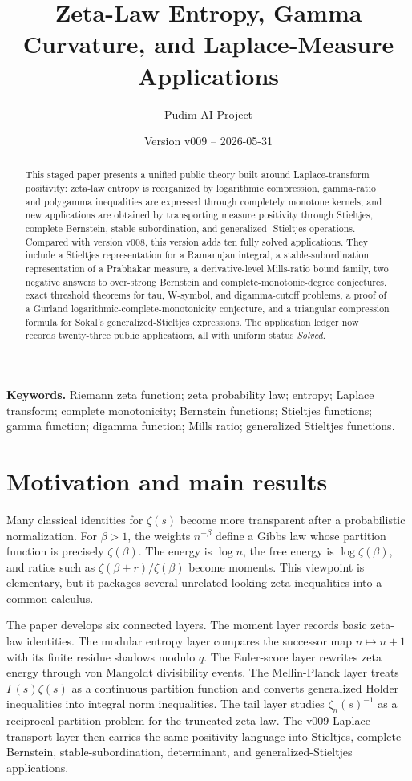 \documentclass[11pt]{article}
\title{Zeta-Law Entropy, Gamma Curvature, and Laplace-Measure Applications}
\author{Pudim AI Project}
\date{Version v009 -- 2026-05-31}
\numberwithin{equation}{section}
\theoremstyle{definition}
\theoremstyle{remark}
\newcommand{\1}{\mathbf 1}
\begin{document}
\maketitle

\begin{abstract}
This staged paper presents a unified public theory built around Laplace-transform
positivity: zeta-law entropy is reorganized by logarithmic compression,
gamma-ratio and polygamma inequalities are expressed through completely monotone
kernels, and new applications are obtained by transporting measure positivity
through Stieltjes, complete-Bernstein, stable-subordination, and generalized-
Stieltjes operations.  Compared with version v008, this version adds ten fully
solved applications.  They include a Stieltjes representation for a Ramanujan
integral, a stable-subordination representation of a Prabhakar measure, a
derivative-level Mills-ratio bound family, two negative answers to over-strong
Bernstein and complete-monotonic-degree conjectures, exact threshold theorems
for tau, W-symbol, and digamma-cutoff problems, a proof of a Gurland
logarithmic-complete-monotonicity conjecture, and a triangular compression
formula for Sokal's generalized-Stieltjes expressions.  The application ledger
now records twenty-three public applications, all with uniform status
\emph{Solved}.
\end{abstract}

\noindent\textbf{Keywords.} Riemann zeta function; zeta probability law; entropy; Laplace transform; complete monotonicity; Bernstein functions; Stieltjes functions; gamma function; digamma function; Mills ratio; generalized Stieltjes functions.

\section{Motivation and main results}

Many classical identities for \(\zeta(s)\) become more transparent after a probabilistic normalization.  For \(\beta>1\), the weights \(n^{-\beta}\) define a Gibbs law whose partition function is precisely \(\zeta(\beta)\).  The energy is \(\log n\), the free energy is \(\log\zeta(\beta)\), and ratios such as \(\zeta(\beta+r)/\zeta(\beta)\) become moments.  This viewpoint is elementary, but it packages several unrelated-looking zeta inequalities into a common calculus.

The paper develops six connected layers.  The moment layer records basic zeta-law identities.  The modular entropy layer compares the successor map \(n\mapsto n+1\) with its finite residue shadows modulo \(q\).  The Euler-score layer rewrites zeta energy through von Mangoldt divisibility events.  The Mellin-Planck layer treats \(\Gamma(s)\zeta(s)\) as a continuous partition function and converts generalized Holder inequalities into integral norm inequalities.  The tail layer studies \(\zeta_n(s)^{-1}\) as a reciprocal partition problem for the truncated zeta law.  The v009 Laplace-transport layer then carries the same positivity language into Stieltjes, complete-Bernstein, stable-subordination, determinant, and generalized-Stieltjes applications.
\end{document}

